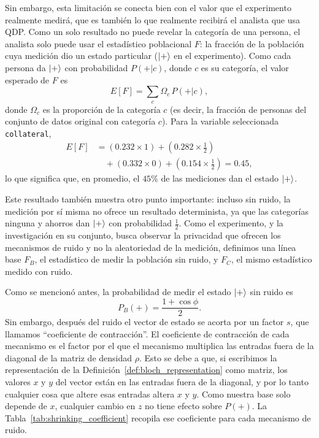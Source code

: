 \documentclass{ieeeaccess}
\begin{document}
Sin embargo, esta limitación se conecta bien con el valor que el experimento realmente medirá, que es también lo que realmente recibirá el analista que usa QDP. Como un solo resultado no puede revelar la categoría de una persona, el analista solo puede usar el estadístico poblacional $F$: la fracción de la población cuya medición dio un estado particular ($\ket{+}$ en el experimento). Como cada persona da $\ket{+}$ con probabilidad $P(+|c)$, donde $c$ es su categoría, el valor esperado de $F$ es
\begin{equation}
  E[F] = \sum_{c} \Omega_c \, P(+|c),
  \label{eq:expected_F}
\end{equation}
donde $\Omega_c$ es la proporción de la categoría $c$ (es decir, la fracción de personas del conjunto de datos original con categoría $c$). Para la variable seleccionada \texttt{collateral},
\begin{align}
  E[F] &= (0.232 \times 1) + \left(0.282 \times \tfrac{1}{2}\right) \nonumber \\
       &\quad + (0.332 \times 0) + \left(0.154 \times \tfrac{1}{2}\right) = 0.45,
  \label{eq:expected_F_collateral}
\end{align}
lo que significa que, en promedio, el $45\%$ de las mediciones dan el estado $\ket{+}$.

Este resultado también muestra otro punto importante: incluso sin ruido, la medición por sí misma no ofrece un resultado determinista, ya que las categorías ninguna y ahorros dan $\ket{+}$ con probabilidad $\frac{1}{2}$. Como el experimento, y la investigación en su conjunto, busca observar la privacidad que ofrecen los mecanismos de ruido y no la aleatoriedad de la medición, definimos una línea base $F_B$, el estadístico de medir la población sin ruido, y $F_C$, el mismo estadístico medido con ruido.

Como se mencionó antes, la probabilidad de medir el estado $\ket{+}$ sin ruido es
\begin{equation}
  P_B(+) = \frac{1+\cos\phi}{2}.
  \label{eq:p_b}
\end{equation}
Sin embargo, después del ruido el vector de estado se acorta por un factor $s$, que llamamos ``coeficiente de contracción''. El coeficiente de contracción de cada mecanismo es el factor por el que el mecanismo multiplica las entradas fuera de la diagonal de la matriz de densidad $\rho$. Esto se debe a que, si escribimos la representación de la Definición~\ref{def:bloch_representation} como matriz, los valores $x$ y $y$ del vector están en las entradas fuera de la diagonal, y por lo tanto cualquier cosa que altere esas entradas altera $x$ y $y$. Como nuestra base solo depende de $x$, cualquier cambio en $z$ no tiene efecto sobre $P(+)$. La Tabla~\ref{tab:shrinking_coefficient} recopila ese coeficiente para cada mecanismo de ruido.
\end{document}
